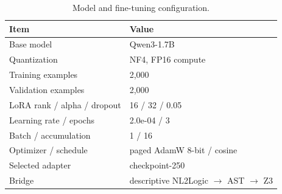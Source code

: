 \begin{table}[t]
\caption{Model and fine-tuning configuration.}
\label{tab:configuration}
\centering
\small
\begin{tabular}{ll}
\toprule
Item & Value \\
\midrule
Base model & Qwen3-1.7B \\
Quantization & NF4, FP16 compute \\
Training examples & 2,000 \\
Validation examples & 2,000 \\
LoRA rank / alpha / dropout & 16 / 32 / 0.05 \\
Learning rate / epochs & 2.0e-04 / 3 \\
Batch / accumulation & 1 / 16 \\
Optimizer / schedule & paged AdamW 8-bit / cosine \\
Selected adapter & checkpoint-250 \\
Bridge & descriptive NL2Logic $\rightarrow$ AST $\rightarrow$ Z3 \\
\bottomrule
\end{tabular}
\end{table}
